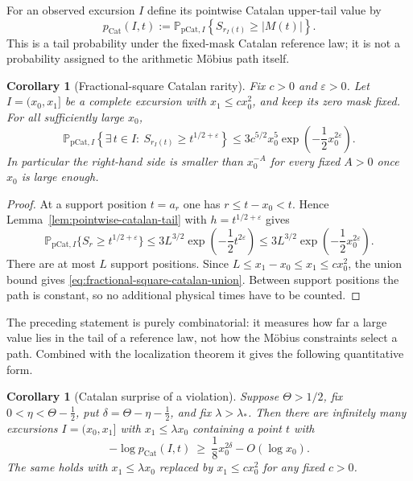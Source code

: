 \documentclass[11pt]{amsart}
\numberwithin{equation}{section}
\theoremstyle{plain}
\newtheorem{corollary}[theorem]{Corollary}
\theoremstyle{definition}
\theoremstyle{remark}
\newcommand{\eps}{\varepsilon}
\begin{document}
For an observed excursion $I$ define its pointwise Catalan upper-tail value
by
\begin{equation}
\label{eq:pointwise-catalan-pvalue}
 p_{\mathrm{Cat}}(I,t):=
 \mathbb P_{\mathrm{pCat},I}
 \left\{S_{r_I(t)}\ge |M(t)|\right\}.
\end{equation}
This is a tail probability under the fixed-mask Catalan reference law; it is
not a probability assigned to the arithmetic M\"obius path itself.

\begin{corollary}[Fractional-square Catalan rarity]
\label{cor:fractional-square-catalan-rarity}
Fix $c>0$ and $\eps>0$.  Let $I=(x_0,x_1]$ be a complete excursion with
$x_1\le cx_0^2$, and keep its zero mask fixed.  For all sufficiently large
$x_0$,
\begin{equation}
\label{eq:fractional-square-catalan-union}
 \mathbb P_{\mathrm{pCat},I}
 \left\{\exists\,t\in I:\ S_{r_I(t)}\ge t^{1/2+\eps}\right\}
 \le 3c^{5/2}x_0^5
 \exp\!\left(-\frac12x_0^{2\eps}\right).
\end{equation}
In particular the right-hand side is smaller than $x_0^{-A}$ for every
fixed $A>0$ once $x_0$ is large enough.
\end{corollary}

\begin{proof}
At a support position $t=a_r$ one has $r\le t-x_0<t$.  Hence
Lemma~\ref{lem:pointwise-catalan-tail} with $h=t^{1/2+\eps}$ gives
\[
 \mathbb P_{\mathrm{pCat},I}\{S_r\ge t^{1/2+\eps}\}
 \le3L^{3/2}\exp\!\left(-\frac12t^{2\eps}\right)
 \le3L^{3/2}\exp\!\left(-\frac12x_0^{2\eps}\right).
\]
There are at most $L$ support positions.  Since
$L\le x_1-x_0\le x_1\le cx_0^2$, the union bound gives
\eqref{eq:fractional-square-catalan-union}.  Between support positions the
path is constant, so no additional physical times have to be counted.
\end{proof}

The preceding statement is purely combinatorial: it measures how far a large
value lies in the tail of a reference law, not how the M\"obius constraints
select a path. Combined with the localization theorem it gives the following
quantitative form.

\begin{corollary}[Catalan surprise of a violation]
\label{cor:catalan-surprise}
\label{thm:catalan-selector-square}
Suppose $\Theta>1/2$, fix $0<\eta<\Theta-\frac12$, put
$\delta=\Theta-\eta-\frac12$, and fix $\lambda>\lambda_*$. Then there are
infinitely many excursions $I=(x_0,x_1]$ with $x_1\le\lambda x_0$ containing
a point $t$ with
\begin{equation}
\label{eq:KP-catalan-surprise}
-\log p_{\mathrm{Cat}}(I,t)\ \ge\ \frac18x_0^{2\delta}-O(\log x_0).
\end{equation}
The same holds with $x_1\le\lambda x_0$ replaced by $x_1\le cx_0^2$ for any
fixed $c>0$.
\end{corollary}
\end{document}
